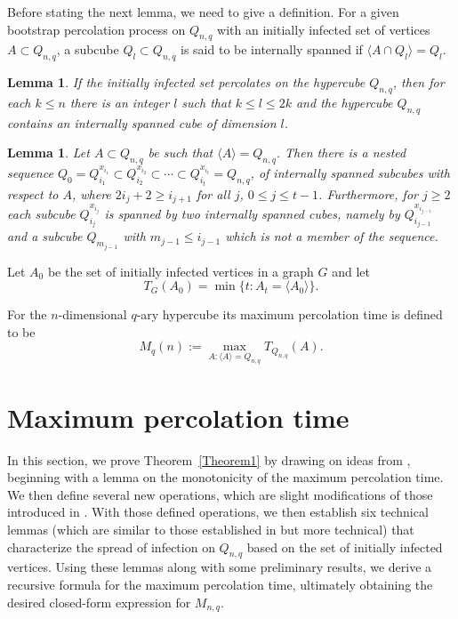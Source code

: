 \documentclass[reqno,11pt]{amsart}
\newtheorem{lemma}[theorem]{Lemma}
\renewcommand{\leq}{\leqslant}
\renewcommand{\geq}{\geqslant}
\begin{document}
Before stating the next lemma, we need to give a definition. For a given bootstrap percolation process on $Q_{n,q}$ with an initially infected set of vertices $A \subset Q_{n,q}$, a subcube $Q_l \subset Q_{n,q}$ is said to be internally spanned if $\langle A \cap Q_l \rangle =Q_l$.

\begin{lemma} \label{lemma: internally spanned}
If the initially infected set percolates on the hypercube $Q_{n,q}$, then for each $k \leq n$ there is an integer $l$ such that $k \leq l \leq 2k$ and the hypercube $Q_{n,q}$ contains an internally spanned cube of dimension $l$. 
\end{lemma}


\begin{lemma} \label{lemma:nested sequence}
Let $A \subset Q_{n,q}$ be such that $\langle A \rangle =Q_{n,q}$. Then there is a nested sequence $Q_0=Q_{i_1}^{x_{i_1}} \subset Q_{i_2}^{x_{i_2}} \subset \cdots \subset Q_{i_t}^{x_{i_t}}=Q_{n,q}$, of internally spanned subcubes with respect to $A$, where $2i_j+2 \geq i_{j+1}$ for all $j$, $ 0 \leq j \leq t-1$. Furthermore, for $j \geq 2$ each subcube $Q_{i_j}^{x_{i_j}}$ is spanned by two internally spanned cubes, namely by $Q_{i_{j-1}}^{x_{i_{j-1}}}$ and a subcube $Q_{m_{j-1}}$ with $m_{j-1} \leq i_{j-1}$ which is not a member of the sequence. 
\end{lemma}

Let $A_0$ be the set of initially infected vertices in a graph $G$ and let $$T_{G}(A_0)= \min \{t:A_t=\langle A_0 \rangle\}.$$ 

For the $n$-dimensional $q$-ary hypercube its maximum percolation time is defined to be  
$$M_q(n):= \max_{A: \langle A \rangle =Q_{n,q}} T_{Q_{n,q}}(A).$$

\section{Maximum percolation time}
In this section, we prove Theorem~\ref{Theorem1} by drawing on ideas from \cite{Michal}, beginning with a lemma on the monotonicity of the maximum percolation time. We then define several new operations, which are slight modifications of those introduced in \cite{Michal}. With those defined operations, we then establish six technical lemmas (which are similar to those established in \cite{Michal} but more technical) that characterize the spread of infection on $Q_{n,q}$ based on the set of initially infected vertices. Using these lemmas along with some preliminary results, we derive a recursive formula for the maximum percolation time, ultimately obtaining the desired closed-form expression for $M_{n,q}$.
 
\end{document}
